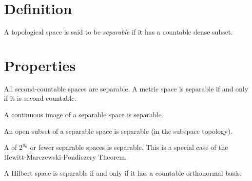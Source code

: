 \documentclass{article}
\begin{document}
\section*{Definition}

A topological space is said to be \emph{separable}
if it has a countable dense subset.

\section*{Properties}

All second-countable spaces are separable.
A metric space is separable if and only if it is second-countable.

A continuous image of a separable space is separable.

An open subset of a separable space is separable (in the subspace topology).

A  of $2^{\aleph_0}$ or fewer separable spaces
is separable. This is a special case of the Hewitt-Marczewski-Pondiczery Theorem.

A Hilbert space is separable if and only if it has a countable orthonormal basis.
\end{document}
